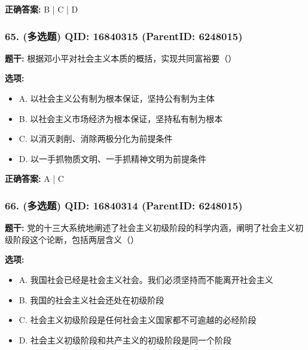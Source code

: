 \documentclass[12pt,UTF8]{ctexart}
\begin{document}
\textbf{正确答案:}
B | C | D

\vspace{0.3em}\hrulefill\vspace{0.7em}

\subsubsection*{65. (多选题) \small QID: 16840315 (ParentID: 6248015)}

\textbf{题干:}
根据邓小平对社会主义本质的概括，实现共同富裕要（）



\textbf{选项:}
\begin{itemize}[leftmargin=*]

  \item A. 以社会主义公有制为根本保证，坚持公有制为主体

  \item B. 以社会主义市场经济为根本保证，坚持私有制为根本

  \item C. 以消灭剥削、消除两极分化为前提条件

  \item D. 以一手抓物质文明、一手抓精神文明为前提条件

\end{itemize}

\textbf{正确答案:}
A | C

\vspace{0.3em}\hrulefill\vspace{0.7em}

\subsubsection*{66. (多选题) \small QID: 16840314 (ParentID: 6248015)}

\textbf{题干:}
党的十三大系统地阐述了社会主义初级阶段的科学内涵，阐明了社会主义初级阶段这个论断，包括两层含义（）



\textbf{选项:}
\begin{itemize}[leftmargin=*]

  \item A. 我国社会已经是社会主义社会。我们必须坚持而不能离开社会主义

  \item B. 我国的社会主义社会还处在初级阶段

  \item C. 社会主义初级阶段是任何社会主义国家都不可逾越的必经阶段

  \item D. 社会主义初级阶段和共产主义的初级阶段是同一个阶段

\end{itemize}
\end{document}
